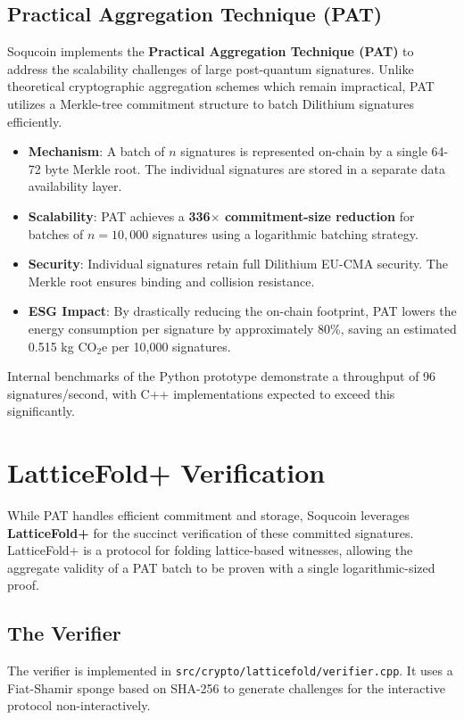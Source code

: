 \documentclass[10pt, twocolumn]{article}
\begin{document}
\subsection{Practical Aggregation Technique (PAT)}
Soqucoin implements the \textbf{Practical Aggregation Technique (PAT)} to address the scalability challenges of large post-quantum signatures. Unlike theoretical cryptographic aggregation schemes which remain impractical, PAT utilizes a Merkle-tree commitment structure to batch Dilithium signatures efficiently.

\begin{itemize}
    \item \textbf{Mechanism}: A batch of $n$ signatures is represented on-chain by a single 64-72 byte Merkle root. The individual signatures are stored in a separate data availability layer.
    \item \textbf{Scalability}: PAT achieves a \textbf{336$\times$ commitment-size reduction} for batches of $n=10,000$ signatures using a logarithmic batching strategy.
    \item \textbf{Security}: Individual signatures retain full Dilithium EU-CMA security. The Merkle root ensures binding and collision resistance.
    \item \textbf{ESG Impact}: By drastically reducing the on-chain footprint, PAT lowers the energy consumption per signature by approximately 80\%, saving an estimated 0.515 kg CO$_2$e per 10,000 signatures.
\end{itemize}

Internal benchmarks of the Python prototype demonstrate a throughput of 96 signatures/second, with C++ implementations expected to exceed this significantly.

\section{LatticeFold+ Verification}

While PAT handles efficient commitment and storage, Soqucoin leverages \textbf{LatticeFold+} for the succinct verification of these committed signatures. LatticeFold+ is a protocol for folding lattice-based witnesses, allowing the aggregate validity of a PAT batch to be proven with a single logarithmic-sized proof.

\subsection{The Verifier}
The verifier is implemented in \texttt{src/crypto/latticefold/verifier.cpp}. It uses a Fiat-Shamir sponge based on SHA-256 to generate challenges for the interactive protocol non-interactively.
\end{document}
